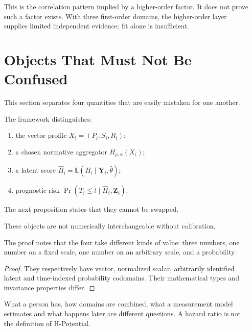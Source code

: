 \begin{remark}
This is the correlation pattern implied by a higher-order factor. It does not
prove such a factor exists. With three first-order domains, the higher-order
layer supplies limited independent evidence; fit alone is insufficient.
\end{remark}

\section{Objects That Must Not Be Confused}
\label{app:a-confusion}

This section separates four quantities that are easily mistaken for one
another.

\begin{definition}
The framework distinguishes:
\begin{enumerate}
 \item the vector profile $X_i=(P_i,S_i,R_i)$;
 \item a chosen normative aggregator $H_{\rho,\alpha}(X_i)$;
 \item a latent score $\widehat H_i=\mathbb E(H_i\mid\mathbf Y_i,\widehat\theta)$;
 \item prognostic risk $\Pr(T_i\le t\mid\widehat H_i,\mathbf Z_i)$.
\end{enumerate}
\end{definition}

The next proposition states that they cannot be swapped.

\begin{proposition}
These objects are not numerically interchangeable without calibration.
\end{proposition}
The proof notes that the four take different kinds of value: three numbers, one
number on a fixed scale, one number on an arbitrary scale, and a probability.
\begin{proof}
They respectively have vector, normalized scalar, arbitrarily identified latent
and time-indexed probability codomains. Their mathematical types and invariance
properties differ.
\end{proof}

\begin{remark}
What a person has, how domains are combined, what a measurement model estimates
and what happens later are different questions. A hazard ratio is not the
definition of H-Potential.
\end{remark}

